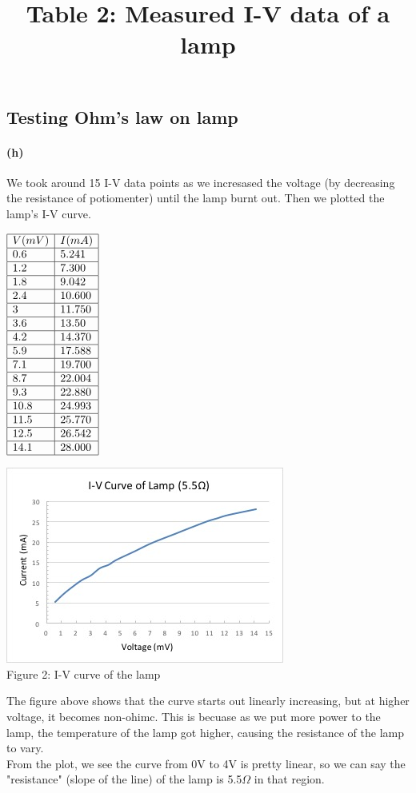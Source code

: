 \documentclass[]{article}
\begin{document}
\subsection*{ Testing Ohm's law on lamp}	
	\paragraph{ (h)}
	We took around 15 I-V data points as we incresased the voltage (by decreasing the resistance of potiomenter) until the lamp burnt out. Then we plotted the lamp's I-V curve. 
		\begin{center} 
			$\begin{array}{ | l | l |  }
			\hline
			V (mV) & I (mA) \\ \hline
			0.6 & 5.241 \\ \hline
			1.2 & 7.300   \\ \hline
			1.8 & 9.042 \\ \hline
			2.4 & 10.600\\ \hline
			3 & 11.750 \\ \hline
			3.6 & 13.50 \\ \hline
			4.2 & 14.370 \\ \hline
			5.9 & 17.588 \\ \hline
			7.1& 19.700 \\ \hline
			8.7 & 22.004  \\ \hline
			9.3& 22.880 \\ \hline
			10.8& 24.993 \\ \hline
			11.5& 25.770 \\ \hline
			12.5& 26.542 \\ \hline
			14.1& 28.000 \\ \hline
			\end{array}$\\
			\title{Table 2: Measured I-V data of a lamp}
		\end{center}
		\begin{center} 
			\includegraphics[scale=0.7]{lab1_lampplot}\\			
			Figure 2: I-V curve of the lamp
		\end{center}
	The figure above shows that the curve starts out  linearly increasing, but at higher voltage, it becomes non-ohimc. This is becuase as we put more power to the lamp, the temperature of the lamp got higher, causing the resistance of the lamp to vary. \\
	From the plot, we see the curve from 0V to 4V is pretty linear, so we can say the "resistance" (slope of the line) of the lamp is 5.5$\Omega$ in that region.
	
\end{document}
